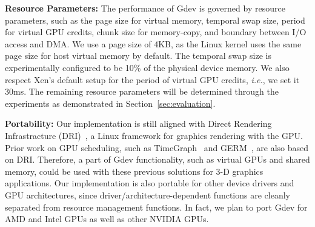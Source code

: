 \textbf{Resource Parameters:}
The performance of Gdev is governed by resource parameters, such as the
page size for virtual memory, temporal swap size, period for virtual GPU
credits, chunk size for memory-copy, and boundary between I/O access and
DMA.
We use a page size of 4KB, as the Linux kernel uses the same page size
for host virtual memory by default.
The temporal swap size is experimentally configured to be 10\% of the
physical device memory.
We also respect Xen's default setup for the period of virtual GPU
credits, \textit{i.e.}, we set it 30ms.
The remaining resource parameters will be determined through the experiments as
demonstrated in Section~\ref{sec:evaluation}.

\textbf{Portability:}
Our implementation is still aligned with Direct Rendering Infrastracture
(DRI)~\cite{DRI}, a Linux framework for graphics rendering with the GPU.
Prior work on GPU scheduling, such as TimeGraph~\cite{Kato_ATC11} and
GERM~\cite{Bautin_MCNC08}, are also based on DRI.
Therefore, a part of Gdev functionality, such as virtual GPUs and shared
memory, could be used with these previous solutions for 3-D graphics
applications.
Our implementation is also portable for other device drivers and GPU
architectures, since driver/architecture-dependent functions are cleanly
separated from resource management functions.
In fact, we plan to port Gdev for AMD and Intel GPUs as well as other
NVIDIA GPUs.
